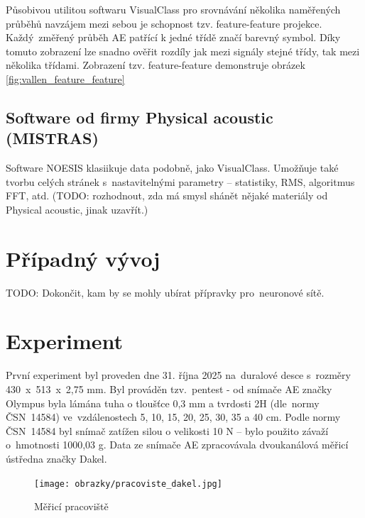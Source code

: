 Působivou utilitou softwaru VisualClass pro srovnávání
několika naměřených průběhů navzájem mezi sebou je 
schopnost tzv. feature-feature projekce.
Každý~změřený průběh AE patřící k jedné třídě 
značí barevný symbol. Díky tomuto zobrazení lze 
snadno ověřit rozdíly jak mezi signály stejné třídy, 
tak mezi několika třídami. Zobrazení tzv. feature-feature demonstruje 
obrázek \ref{fig:vallen_feature_feature}

\subsection{Software od firmy Physical acoustic (MISTRAS)}
Software NOESIS klasiikuje data podobně, 
jako VisualClass. Umožňuje také tvorbu celých stránek 
s~nastavitelnými parametry – statistiky, 
RMS, algoritmus FFT, atd. (TODO: rozhodnout,
zda má smysl shánět nějaké materiály od Physical acoustic,
 jinak uzavřít.)
\section{Případný vývoj}
TODO: Dokončit, kam by se mohly ubírat přípravky pro~neuronové sítě.
\section{Experiment}
První experiment byl 
proveden dne 31. října 2025 na~duralové
desce s~rozměry 430~x~513~x~2,75 mm. Byl prováděn 
tzv.~pentest - od snímače AE značky 
Olympus byla lámána tuha
o tloušťce 0,3 mm a tvrdosti 2H (dle~normy ČSN~14584\cite{čsn14584})
ve~vzdálenostech 5, 10, 15, 20, 25, 30, 35 a 40 cm.
Podle normy ČSN~14584\cite{čsn14584} byl snímač 
zatížen silou o velikosti 10 N – bylo použito závaží
o~hmotnosti 1000,03 g.
Data ze snímače AE zpracovávala dvoukanálová měřicí ústředna
značky Dakel.

\begin{figure}[htbp]
    \centering
    \texttt{[image: obrazky/pracoviste\_dakel.jpg]}
    \caption{Měřicí pracoviště}
    \label{fig:dakel_pracoviste}
\end{figure}






